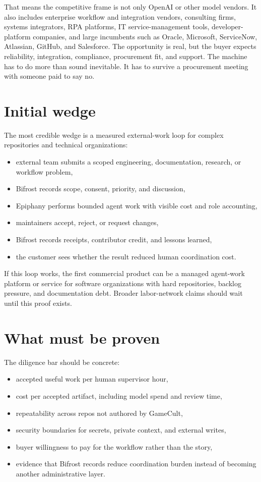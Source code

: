 \documentclass[11pt,oneside]{report}
\begin{document}
That means the competitive frame is not only OpenAI or other model vendors. It also includes enterprise workflow and integration vendors, consulting firms, systems integrators, RPA platforms, IT service-management tools, developer-platform companies, and large incumbents such as Oracle, Microsoft, ServiceNow, Atlassian, GitHub, and Salesforce. The opportunity is real, but the buyer expects reliability, integration, compliance, procurement fit, and support. The machine has to do more than sound inevitable. It has to survive a procurement meeting with someone paid to say no.

\section{Initial wedge}

The most credible wedge is a measured external-work loop for complex repositories and technical organizations:

\begin{itemize}
  \item external team submits a scoped engineering, documentation, research, or workflow problem,
  \item Bifrost records scope, consent, priority, and discussion,
  \item Epiphany performs bounded agent work with visible cost and role accounting,
  \item maintainers accept, reject, or request changes,
  \item Bifrost records receipts, contributor credit, and lessons learned,
  \item the customer sees whether the result reduced human coordination cost.
\end{itemize}

If this loop works, the first commercial product can be a managed agent-work platform or service for software organizations with hard repositories, backlog pressure, and documentation debt. Broader labor-network claims should wait until this proof exists.

\section{What must be proven}

The diligence bar should be concrete:

\begin{itemize}
  \item accepted useful work per human supervisor hour,
  \item cost per accepted artifact, including model spend and review time,
  \item repeatability across repos not authored by GameCult,
  \item security boundaries for secrets, private context, and external writes,
  \item buyer willingness to pay for the workflow rather than the story,
  \item evidence that Bifrost records reduce coordination burden instead of becoming another administrative layer.
\end{itemize}
\end{document}
